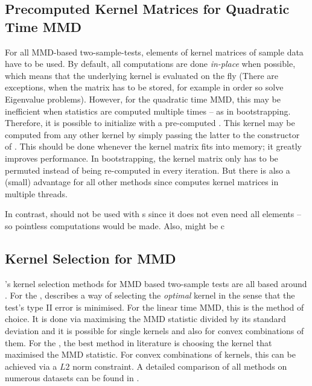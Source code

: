 \subsection{Precomputed Kernel Matrices for Quadratic Time MMD}
\label{sec:quadratic_mmd_precomputed_kernel}
For all MMD-based two-sample-tests, elements of kernel matrices of sample data have to be used. By default, all computations are done \emph{in-place} when possible, which means that the underlying kernel is evaluated on the fly (There are exceptions, when the matrix has to be stored, for example in order so solve Eigenvalue problems). However, for the quadratic time MMD, this may be inefficient when statistics are computed multiple times -- as in bootstrapping. Therefore, it is possible to initialize  with a pre-computed . This kernel may be computed from any other kernel by simply passing the latter to the constructor of . This should be done whenever the kernel matrix fits into memory; it greatly improves performance. In bootstrapping, the kernel matrix only has to be permuted instead of being re-computed in every iteration. But there is also a (small) advantage for all other methods since \shogun{} computes kernel matrices in multiple threads.

In contrast,  should not be used with s since it does not even need all elements -- so pointless computations would be made. Also,  might be c

\subsection{Kernel Selection for MMD}
\label{sec:statistical_tests-mmd-kernel_selection}

\shogun{}'s kernel selection methods for MMD based two-sample tests are all based around  \cite{Sriperumbudur2009, Gretton2012a}. For the , \cite{Gretton2012a} describes a way of selecting the \emph{optimal} kernel in the sense that the test's type II error is minimised. For the linear time MMD, this is the method of choice. It is done via maximising the MMD statistic divided by its standard deviation and it is possible for single kernels and also for convex combinations of them. For the , the best method in literature is choosing the kernel that maximised the MMD statistic. For convex combinations of kernels, this can be achieved via a $L2$ norm constraint. A detailed comparison of all methods on numerous datasets can be found in \cite{Strathmann2012}.

